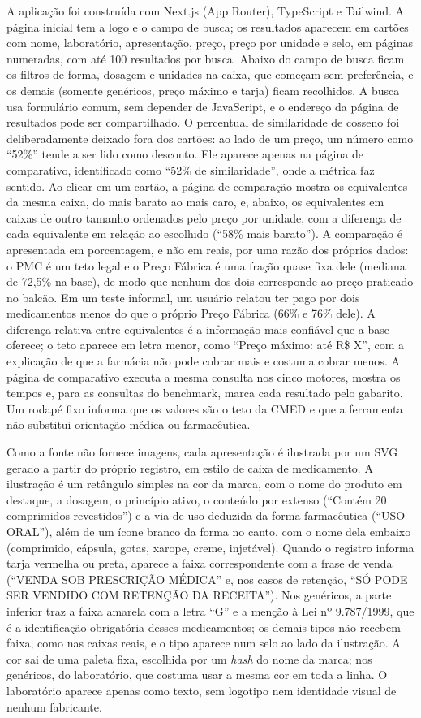 \documentclass[12pt,oneside,a4paper,english,brazil]{abntex2}
\begin{document}
A aplicação foi construída com Next.js (App Router), TypeScript e Tailwind. A página inicial tem a logo e o campo de busca; os resultados aparecem em cartões com nome, laboratório, apresentação, preço, preço por unidade e selo, em páginas numeradas, com até 100 resultados por busca. Abaixo do campo de busca ficam os filtros de forma, dosagem e unidades na caixa, que começam sem preferência, e os demais (somente genéricos, preço máximo e tarja) ficam recolhidos. A busca usa formulário comum, sem depender de JavaScript, e o endereço da página de resultados pode ser compartilhado. O percentual de similaridade de cosseno foi deliberadamente deixado fora dos cartões: ao lado de um preço, um número como ``52\%'' tende a ser lido como desconto. Ele aparece apenas na página de comparativo, identificado como ``52\% de similaridade'', onde a métrica faz sentido. Ao clicar em um cartão, a página de comparação mostra os equivalentes da mesma caixa, do mais barato ao mais caro, e, abaixo, os equivalentes em caixas de outro tamanho ordenados pelo preço por unidade, com a diferença de cada equivalente em relação ao escolhido (``58\% mais barato''). A comparação é apresentada em porcentagem, e não em reais, por uma razão dos próprios dados: o PMC é um teto legal e o Preço Fábrica é uma fração quase fixa dele (mediana de 72,5\% na base), de modo que nenhum dos dois corresponde ao preço praticado no balcão. Em um teste informal, um usuário relatou ter pago por dois medicamentos menos do que o próprio Preço Fábrica (66\% e 76\% dele). A diferença relativa entre equivalentes é a informação mais confiável que a base oferece; o teto aparece em letra menor, como ``Preço máximo: até R\$ X'', com a explicação de que a farmácia não pode cobrar mais e costuma cobrar menos. A página de comparativo executa a mesma consulta nos cinco motores, mostra os tempos e, para as consultas do benchmark, marca cada resultado pelo gabarito. Um rodapé fixo informa que os valores são o teto da CMED e que a ferramenta não substitui orientação médica ou farmacêutica.

Como a fonte não fornece imagens, cada apresentação é ilustrada por um SVG gerado a partir do próprio registro, em estilo de caixa de medicamento. A ilustração é um retângulo simples na cor da marca, com o nome do produto em destaque, a dosagem, o princípio ativo, o conteúdo por extenso (``Contém 20 comprimidos revestidos'') e a via de uso deduzida da forma farmacêutica (``USO ORAL''), além de um ícone branco da forma no canto, com o nome dela embaixo (comprimido, cápsula, gotas, xarope, creme, injetável). Quando o registro informa tarja vermelha ou preta, aparece a faixa correspondente com a frase de venda (``VENDA SOB PRESCRIÇÃO MÉDICA'' e, nos casos de retenção, ``SÓ PODE SER VENDIDO COM RETENÇÃO DA RECEITA''). Nos genéricos, a parte inferior traz a faixa amarela com a letra ``G'' e a menção à Lei nº 9.787/1999, que é a identificação obrigatória desses medicamentos; os demais tipos não recebem faixa, como nas caixas reais, e o tipo aparece num selo ao lado da ilustração. A cor sai de uma paleta fixa, escolhida por um \emph{hash} do nome da marca; nos genéricos, do laboratório, que costuma usar a mesma cor em toda a linha. O laboratório aparece apenas como texto, sem logotipo nem identidade visual de nenhum fabricante.
\end{document}
